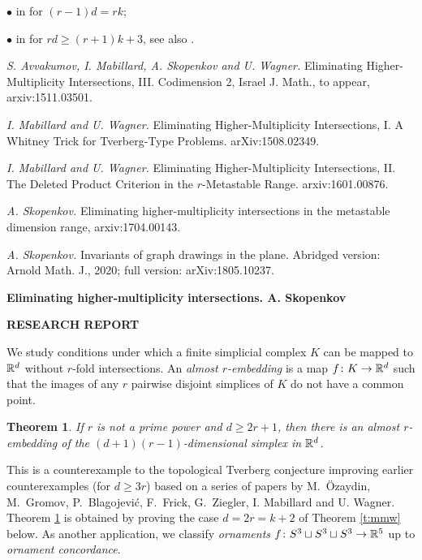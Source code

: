 \documentclass[12pt]{article}
\theoremstyle{plain}
\newtheorem{Theorem}{Theorem}[section]
\theoremstyle{definition}
\begin{document}
$\bullet$ in \cite{MW15, AMSW} for $(r-1)d=rk$;

$\bullet$ in \cite{Sk17} for $rd\ge(r+1)k+3$, see also \cite{MW16}.

 \emph{S. Avvakumov, I. Mabillard, A. Skopenkov and U. Wagner.}
Eliminating Higher-Multiplicity Intersections, III. Codimension 2, Israel J. Math., to appear, arxiv:1511.03501.

 \emph{I. Mabillard and U. Wagner.}
Eliminating Higher-Multiplicity Intersections, I. A Whitney Trick for Tverberg-Type Problems. arXiv:1508.02349.

 \emph{I. Mabillard and U. Wagner.} Eliminating Higher-Multiplicity Intersections, II. The Deleted Product Criterion in the $r$-Metastable Range. arxiv:1601.00876.

 \emph{A. Skopenkov.}
Eliminating higher-multiplicity intersections in the metastable dimension range,  arxiv:1704.00143.

 \emph{A. Skopenkov.} Invariants of graph drawings in the plane.
Abridged version: Arnold Math. J., 2020; full version: arXiv:1805.10237.

{\bf Eliminating higher-multiplicity intersections. A. Skopenkov}

\bigskip
{\bf RESEARCH REPORT}

\smallskip
We study conditions under which a finite simplicial complex $K$ can be mapped to ${\mathbb R}^d$ without $r$-fold
intersections.
An \emph{almost $r$-embedding} is a map $f\colon K\to {\mathbb R}^d$ such that the images of any $r$ pairwise disjoint simplices of $K$ do not have a common point.

\begin{Theorem}\label{t:tve} \cite{AMSW} If $r$ is not a prime power and $d\geq 2r+1$, then there is an almost $r$-embedding of the $(d+1)(r-1)$-dimensional simplex in ${\mathbb R}^d$.
\end{Theorem}

This is a counterexample to the topological Tverberg conjecture improving earlier counterexamples (for $d\geq 3r$) based on a series of papers by M.\ \"Ozaydin, M.\ Gromov, P.\ Blagojevi\'{c}, F.\ Frick, G.\ Ziegler, I. Mabillard and U. Wagner.
Theorem \ref{t:tve} is obtained by proving the case $d=2r=k+2$ of Theorem \ref{t:mmw} below.
As another application, we classify \emph{ornaments} $f\colon S^3 \sqcup S^3 \sqcup S^3\to {\mathbb R}^5$ up to \emph{ornament concordance}.

\end{document}
